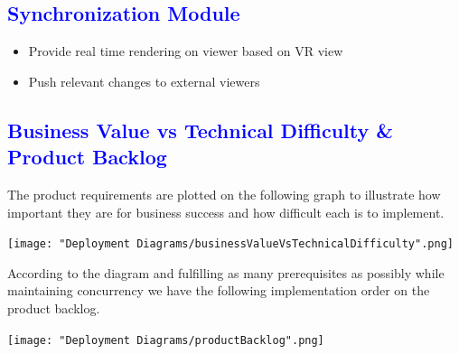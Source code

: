\documentclass[12pt]{article}
\begin{document}
\begin{flushleft}
	\textcolor{blue}{\subsection{Synchronization Module}}	
	\begin{flushleft}
	\begin{itemize}
	\item Provide real time rendering on viewer based on VR view
	\item Push relevant changes to external viewers
	\end{itemize}	
	\end{flushleft}

\end{flushleft}

\textcolor{blue}{\section{Business Value vs Technical Difficulty \& Product Backlog}}
\begin{flushleft}
 	
 	The product requirements are plotted on the following graph to illustrate how important they are for business success and how difficult each is to implement.
	
	\texttt{[image: "Deployment Diagrams/businessValueVsTechnicalDifficulty".png]}
	
	According to the diagram and fulfilling as many prerequisites as possibly while maintaining concurrency we have the following implementation order on the product backlog.
	
	\texttt{[image: "Deployment Diagrams/productBacklog".png]}

\end{flushleft}
\end{document}

